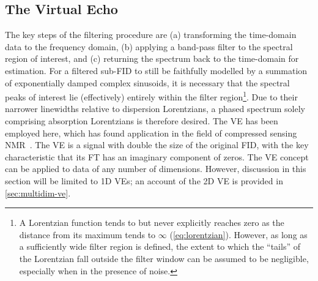 \subsection{The Virtual Echo}
\label{subsec:ve}
The key steps of the filtering procedure are
(a) transforming the time-domain data to the frequency domain,
(b) applying a band-pass filter to the spectral region of interest, and
(c) returning the spectrum back to the time-domain for estimation.
For a filtered sub-\ac{FID} to still be faithfully modelled by a
summation of exponentially damped complex sinusoids, it is necessary that the
spectral peaks of interest lie (effectively) entirely within the filter
region\footnote{
    A Lorentzian function tends to but never explicitly reaches zero as the
    distance from its maximum tends to $\infty$ (\cref{eq:lorentzian}).
    However, as long as a sufficiently wide filter region is defined, the
    extent to which the ``tails'' of the Lorentzian fall outside the filter
    window can be assumed to be negligible, especially when in the presence of
    noise.
}.
Due to their narrower linewidths relative to dispersion Lorentzians, a phased
spectrum solely comprising absorption Lorentzians is therefore desired.
The \ac{VE} has been employed here, which has found application in the field of
compressed sensing NMR~\cite{Mayzel2014,Golowicz2020,Luo2020}. The \ac{VE} is a
signal with double the size of the original \ac{FID}, with the key
characteristic that its \ac{FT} has an imaginary component of zeros. The
\ac{VE} concept can be applied to data of any number of dimensions. However,
discussion in this section will be limited to \ac{1D} \acp{VE};
an account of the \ac{2D} \ac{VE} is provided in \cref{sec:multidim-ve}.

